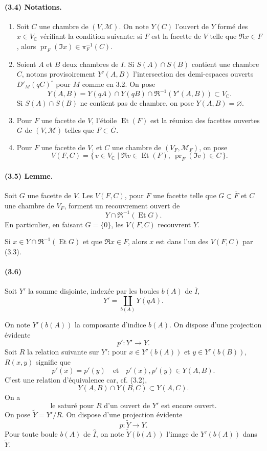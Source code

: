 \documentclass[10pt]{article}
\newcommand{\C}{\mathbb C}
\begin{document}
\paragraph{(3.4) Notations.}
\begin{enumerate}[label=(\roman*)]
\item Soit \(C\) une chambre de \((V,\mathcal M)\). On note \(Y(C)\) l'ouvert de \(Y\) formé des \(x\in V_\C\) vérifiant la condition suivante: si \(F\) est la facette de \(V\) telle que \(\Re x\in F\), alors \(\operatorname{pr}_F(\Im x)\in \pi_F^{-1}(C)\).
\item Soient \(A\) et \(B\) deux chambres de \(I\). Si \(S(A)\cap S(B)\) contient une chambre \(C\), notons provisoirement \(Y'(A,B)\) l'intersection des demi-espaces ouverts \(D'_M(qC)^\circ\) pour \(M\) comme en 3.2. On pose
\[
Y(A,B)=Y(qA)\cap Y(qB)\cap \Re^{-1}(Y'(A,B))\subset V_\C.
\]
Si \(S(A)\cap S(B)\) ne contient pas de chambre, on pose \(Y(A,B)=\varnothing\).
\item Pour \(F\) une facette de \(V\), l'étoile \(\operatorname{Et}(F)\) est la réunion des facettes ouvertes \(G\) de \((V,\mathcal M)\) telles que \(F\subset \overline G\).
\item Pour \(F\) une facette de \(V\), et \(C\) une chambre de \((V_F,\mathcal M_F)\), on pose
\[
V(F,C)=\{\,v\in V_\C\mid \Re v\in\operatorname{Et}(F),\ \operatorname{pr}_F(\Im v)\in C\,\}.
\]
\end{enumerate}

\paragraph{(3.5) Lemme.} Soit \(G\) une facette de \(V\). Les \(V(F,C)\), pour \(F\) une facette telle que \(G\subset\overline F\) et \(C\) une chambre de \(V_F\), forment un recouvrement ouvert de
\[
Y\cap \Re^{-1}(\operatorname{Et}G).
\]
En particulier, en faisant \(G=\{0\}\), les \(V(F,C)\) recouvrent \(Y\).

Si \(x\in Y\cap\Re^{-1}(\operatorname{Et}G)\) et que \(\Re x\in F\), alors \(x\) est dans l'un des \(V(F,C)\) par (3.3).

\paragraph{(3.6)} Soit \(Y'\) la somme disjointe, indexée par les boules \(b(A)\) de \(\overline I\),
\[
Y'=\coprod_{b(A)}Y(qA).
\]




On note \(Y'(b(A))\) la composante d'indice \(b(A)\). On dispose d'une projection évidente
\[
p':Y'\longrightarrow Y.
\]
Soit \(R\) la relation suivante sur \(Y'\): pour \(x\in Y'(b(A))\) et \(y\in Y'(b(B))\), \(R(x,y)\) signifie que
\[
p'(x)=p'(y)\quad\text{et}\quad p'(x),p'(y)\in Y(A,B).
\]
C'est une relation d'équivalence car, cf. (3.2),
\[
Y(A,B)\cap Y(B,C)\subset Y(A,C).
\]
On a
\[
\tag{3.6.1}
\text{le saturé pour }R\text{ d'un ouvert de }Y'\text{ est encore ouvert.}
\]
On pose \(\widetilde Y=Y'/R\). On dispose d'une projection évidente
\[
p:\widetilde Y\longrightarrow Y.
\]
Pour toute boule \(b(A)\) de \(\widehat I\), on note \(\widetilde Y(b(A))\) l'image de \(Y'(b(A))\) dans \(\widetilde Y\).
\end{document}
